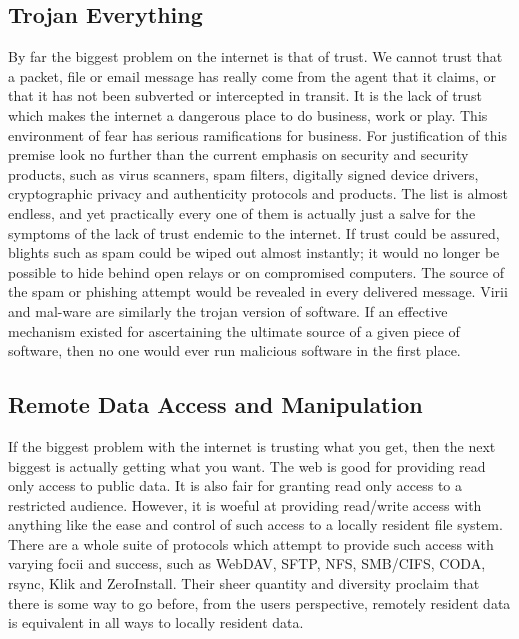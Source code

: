 \documentclass[british,english]{article}
\begin{document}
\subsection{Trojan Everything}

By far the biggest problem on the internet is that of trust. We cannot
trust that a packet, file or email message has really come from the
agent that it claims, or that it has not been subverted or intercepted
in transit. It is the lack of trust which makes the internet a dangerous
place to do business, work or play. This environment of fear has serious
ramifications for business\citep{SaraGatesSun_IdentManagement}. For
justification of this premise look no further than the current emphasis
on security and security products, such as virus scanners, spam filters,
digitally signed device drivers, cryptographic privacy and authenticity
protocols and products. The list is almost endless, and yet practically
every one of them is actually just a salve for the symptoms of the
lack of trust endemic to the internet. If trust could be assured,
blights such as spam could be wiped out almost instantly; it would
no longer be possible to hide behind open relays or on compromised
computers. The source of the spam or phishing attempt would be revealed
in every delivered message. Virii and mal-ware are similarly the trojan
version of software. If an effective mechanism existed for ascertaining
the ultimate source of a given piece of software, then no one would
ever run malicious software in the first place.


\subsection{Remote Data Access and Manipulation}

If the biggest problem with the internet is trusting what you get,
then the next biggest is actually getting what you want. The web is
good for providing read only access to public data. It is also fair
for granting read only access to a restricted audience. However, it
is woeful at providing read/write access with anything like the ease
and control of such access to a locally resident file system. There
are a whole suite of protocols which attempt to provide such access
with varying focii and success, such as WebDAV\citep{WebDAV}, SFTP\citep{ssh},
NFS\citep{nfs_rfc}, SMB/CIFS\citep{cifs_smb}, CODA\citep{satyanarayanan90coda},
rsync\citep{tridgell98rsync_algorithm}, Klik\citep{klik} and ZeroInstall\citep{ZeroInstall}.
Their sheer quantity and diversity proclaim that there is some way
to go before, from the users perspective, remotely resident data is
equivalent in all ways to locally resident data.
\end{document}
